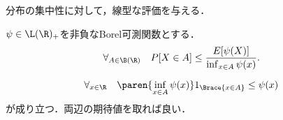 \documentclass[uplatex,dvipdfmx]{jsreport}
\begin{document}
\begin{tcolorbox}[colframe=ForestGreen, colback=ForestGreen!10!white,breakable,colbacktitle=ForestGreen!40!white,coltitle=black,fonttitle=\bfseries\sffamily,
title=]
    分布の集中性に対して，線型な評価を与える．
\end{tcolorbox}

\begin{theorem}\label{thm-Chebyshev-inequality}\mbox{}
    $\psi\in\L(\R)_+$を非負なBorel可測関数とする．
    \[\forall_{A\in\B(\R)}\quad P[X\in A]\le\frac{E[\psi(X)]}{\inf_{x\in A}\psi(x)}.\]
\end{theorem}
\begin{Proof}
    \[\forall_{x\in\R}\quad\paren{\inf_{x\in A}\psi(x)}1_{\Brace{x\in A}}\le\psi(x)\]
    が成り立つ．両辺の期待値を取れば良い．
\end{Proof}
\end{document}
